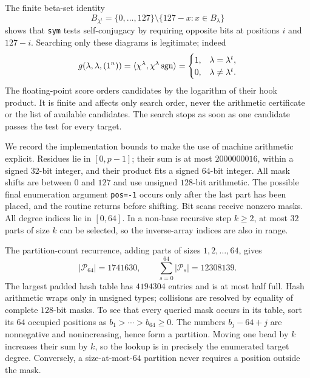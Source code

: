 The finite beta-set identity
\[
 B_{\lambda^t}=\{0,\ldots,127\}
                 \setminus\{127-x:x\in B_\lambda\}
\]
shows that \texttt{sym} tests self-conjugacy by requiring opposite bits at
positions $i$ and $127-i$.  Searching only these diagrams is legitimate;
indeed
\[
 g(\lambda,\lambda,(1^n))
   =\langle\chi^\lambda,\chi^\lambda\operatorname{sgn}\rangle
   =\begin{cases}1,&\lambda=\lambda^t,\\0,&\lambda\ne\lambda^t.\end{cases}
\]
The floating-point score orders candidates by the logarithm of their hook
product.  It is finite and affects only search order, never the arithmetic
certificate or the list of available candidates. The search stops as
soon as one candidate passes the test for every target.

We record the implementation bounds to make the use of machine arithmetic
explicit.  Residues lie in $[0,p-1]$; their sum is at most $2000000016$,
within a signed $32$-bit integer, and their product fits a signed $64$-bit
integer.  All mask shifts are between $0$ and $127$ and use unsigned
$128$-bit arithmetic.  The possible final enumeration argument
\texttt{pos=-1} occurs only after the last part has been placed, and the
routine returns before shifting.  Bit scans receive nonzero masks.
All degree indices lie in $[0,64]$.  In a non-base recursive step $k\geq2$,
at most $32$ parts of size $k$ can be selected, so the inverse-array indices
are also in range.

The partition-count recurrence, adding parts of sizes $1,2,\ldots,64$,
gives
\[
  |\mathcal P_{64}|=1741630,
  \qquad \sum_{s=0}^{64}|\mathcal P_s|=12308139.
\]
The largest padded hash table has $4194304$ entries and is at most half
full.  Hash arithmetic wraps only in unsigned types; collisions are
resolved by equality of complete $128$-bit masks.  To see that every queried
mask occurs in its table, sort its $64$ occupied positions as
$b_1>\cdots>b_{64}\geq0$.  The numbers $b_j-64+j$ are nonnegative and
nonincreasing, hence form a partition.  Moving one bead by $k$ increases
their sum by $k$, so the lookup is in precisely the enumerated target
degree.  Conversely, a size-at-most-$64$ partition never requires a
position outside the mask.

